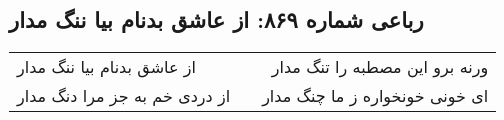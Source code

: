 \begin{center}
\section*{رباعی شماره ۸۶۹: از عاشق بدنام بیا ننگ مدار}
\label{sec:0869}
\begin{longtable}{l p{0.5cm} r}
از عاشق بدنام بیا ننگ مدار
&&
ورنه برو این مصطبه را تنگ مدار
\\
از دردی خم به جز مرا دنگ مدار
&&
ای خونی خونخواره ز ما چنگ مدار
\\
\end{longtable}
\end{center}
